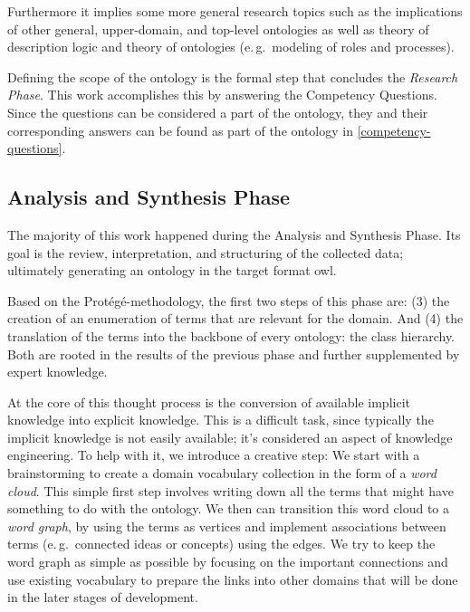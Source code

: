 \documentclass[a4paper, DIV=13, BCOR=0cm]{scrbook}
\newcommand{\eg}{e.\,g.\ }
\begin{document}
Furthermore it implies some more general research topics such as the implications of other general, upper-domain, and top-level ontologies as well as theory of description logic and theory of ontologies (\eg modeling of roles and processes).

Defining the scope of the ontology is the formal step that concludes the \textit{Research Phase}. This work accomplishes this by answering the Competency Questions. Since the questions can be considered a part of the ontology, they and their corresponding answers can be found as part of the ontology in \autoref{competency-questions}.

\subsection{Analysis and Synthesis Phase}
\label{analysis}
The majority of this work happened during the Analysis and Synthesis Phase. Its goal is the review, interpretation, and structuring of the collected data; ultimately generating an ontology in the target format \gls{owl}.

Based on the Protégé-methodology, the first two steps of this phase are: (3) the creation of an enumeration of terms that are relevant for the domain. And (4) the translation of the terms into the backbone of every ontology: the class hierarchy. Both are rooted in the results of the previous phase and further supplemented by expert knowledge.

At the core of this thought process is the conversion of available implicit knowledge into explicit knowledge. This is a difficult task, since typically the implicit knowledge is not easily available; it's considered an aspect of knowledge engineering. \cite[p.\,30--31]{moore2011towards} To help with it, we introduce a creative step: We start with a brainstorming to create a domain vocabulary collection in the form of a \textit{word cloud}. This simple first step involves writing down all the terms that might have something to do with the ontology. We then can transition this word cloud to a \textit{word graph}, by using the terms as vertices and implement associations between terms (\eg connected ideas or concepts) using the edges. We try to keep the word graph as simple as possible by focusing on the important connections and use existing vocabulary to prepare the links into other domains that will be done in the later stages of development.
\end{document}
